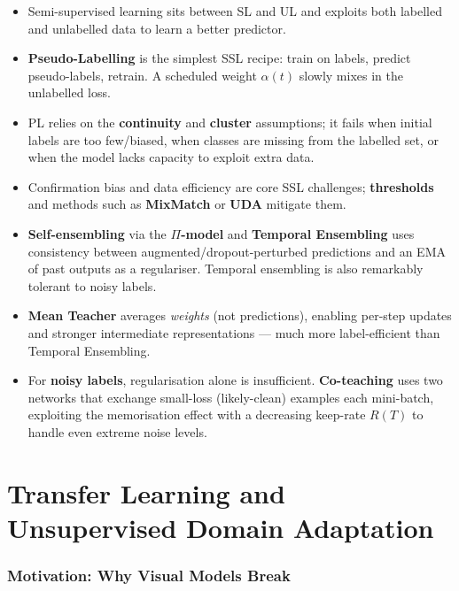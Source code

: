\documentclass[11pt,a4paper]{article}
\theoremstyle{definition}
\theoremstyle{plain}
\theoremstyle{remark}
\begin{document}
\begin{tcolorbox}[colback=yellow!5!white,colframe=orange!80!black,title=\textbf{Take-Home Messages}]
\begin{itemize}[leftmargin=*]
    \item Semi-supervised learning sits between SL and UL and exploits both labelled and unlabelled data to learn a better predictor.
    \item \textbf{Pseudo-Labelling} is the simplest SSL recipe: train on labels, predict pseudo-labels, retrain. A scheduled weight $\alpha(t)$ slowly mixes in the unlabelled loss.
    \item PL relies on the \textbf{continuity} and \textbf{cluster} assumptions; it fails when initial labels are too few/biased, when classes are missing from the labelled set, or when the model lacks capacity to exploit extra data.
    \item Confirmation bias and data efficiency are core SSL challenges; \textbf{thresholds} and methods such as \textbf{MixMatch} or \textbf{UDA} mitigate them.
    \item \textbf{Self-ensembling} via the \textbf{$\Pi$-model} and \textbf{Temporal Ensembling} uses consistency between augmented/dropout-perturbed predictions and an EMA of past outputs as a regulariser. Temporal ensembling is also remarkably tolerant to noisy labels.
    \item \textbf{Mean Teacher} averages \emph{weights} (not predictions), enabling per-step updates and stronger intermediate representations --- much more label-efficient than Temporal Ensembling.
    \item For \textbf{noisy labels}, regularisation alone is insufficient. \textbf{Co-teaching} uses two networks that exchange small-loss (likely-clean) examples each mini-batch, exploiting the memorisation effect with a decreasing keep-rate $R(T)$ to handle even extreme noise levels.
\end{itemize}
\end{tcolorbox}



\part{Transfer Learning and Unsupervised Domain Adaptation}

\section{Motivation: Why Visual Models Break}
\end{document}
